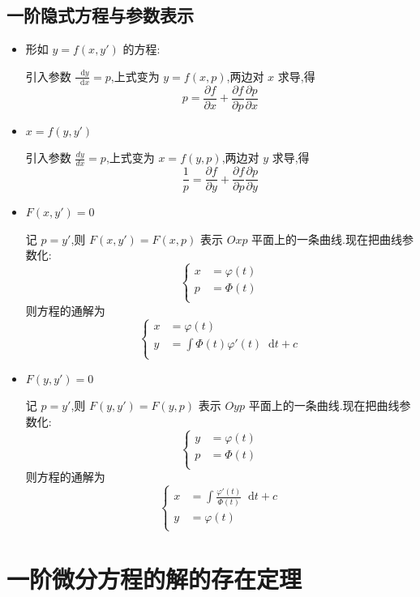 \documentclass{ctexart}
\newcommand*{\dif}{\mathop{}\!\mathrm{d}}
\numberwithin{equation}{subsection}
\begin{document}
\subsection{一阶隐式方程与参数表示}
\begin{itemize}
        \item 形如 $y=f(x,y')$ 的方程:
        
        引入参数 $\frac{\dif y}{\dif x}=p$,上式变为 $y=f(x,p)$,两边对 $x$ 求导,得 
        \[p=\frac{\partial f}{\partial x}+\frac{\partial f}{\partial p}\frac{\partial p}{\partial x}\]
        \item $x=f(y,y')$
        
        引入参数 $\frac{dy}{dx}=p$,上式变为 $x=f(y,p)$,两边对 $y$ 求导,得 
        \[\frac{1}{p}=\frac{\partial f}{\partial y}+\frac{\partial f}{\partial p}\frac{\partial p}{\partial y}\]
        \item $F(x,y')=0$
        
        记 $p=y'$,则 $F(x,y')=F(x,p)$ 表示 $Oxp$ 平面上的一条曲线.现在把曲线参数化:
        \[\left\{\begin{aligned}
                x&=\varphi(t)\\
                p&=\varPhi(t)\\
        \end{aligned}\right.\]
        则方程的通解为 
        \[\left\{\begin{aligned}
                x&=\varphi(t)\\
                y&=\int\varPhi(t)\varphi'(t)\dif t +c\\
        \end{aligned}\right.\]      
        \item $F(y,y')=0$
        
        记 $p=y'$,则 $F(y,y')=F(y,p)$ 表示 $Oyp$ 平面上的一条曲线.现在把曲线参数化:
        \[\left\{\begin{aligned}
                y&=\varphi(t)\\
                p&=\varPhi(t)\\
        \end{aligned}\right.\]
        则方程的通解为 
        \[\left\{\begin{aligned}
                x&=\int\frac{\varphi'(t)}{\varPhi(t)}\dif t+c\\
                y&=\varphi(t)\\
        \end{aligned}\right.\] 
\end{itemize}
\section{一阶微分方程的解的存在定理}
\end{document}
